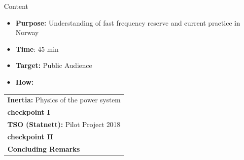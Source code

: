 \documentclass{beamer}
\begin{document}
\begin{frame}
\titlepage
\end{frame}
\begin{frame}{Content}
\begin{itemize}
\item \textbf{Purpose:} Understanding of fast frequency reserve and current practice in Norway
\item \textbf{Time}: 45 min
\item \textbf{Target:} Public Audience
\item \textbf{How:} 
\end{itemize}
\begin{center}
\begin{tabular}{|l|} 
\hline
\rowcolor{Gray} \textbf{Inertia:} Physics of the power system \\
 \textbf{checkpoint I}\\
 \rowcolor{Gray} \textbf{TSO (Statnett):} Pilot Project 2018\\
 \textbf{checkpoint II}\\
 \rowcolor{Gray} \textbf{Concluding Remarks}\\
\hline
\end{tabular}
\end{center}



\end{frame}
\end{document}

